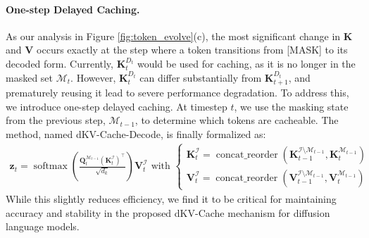 \documentclass{article}
\newcommand{\dmethodname}{dKV-Cache-Decode}
\newcommand{\bk}{\mathbf{K}}
\newcommand{\bv}{\mathbf{V}}
\begin{document}
\paragraph{One-step Delayed Caching.} As our analysis in Figure \ref{fig:token_evolve}(c), the most significant change in $\bk$ and $\bv$ occurs exactly at the step where a token transitions from [MASK] to its decoded form. Currently, $\mathbf{K}_t^{D_t}$ would be used for caching, as it is no longer in the masked set $\mathcal{M}_t$. However, $\mathbf{K}_t^{D_t}$ can differ substantially from $\mathbf{K}_{t+1}^{D_t}$, and prematurely reusing it lead to severe performance degradation. To address this, we introduce one-step delayed caching. At timestep $t$, we use the masking state from the previous step, $\mathcal{M}_{t-1}$, to determine which tokens are cacheable. The method, named \dmethodname, is finally formalized as:
\begin{align}
    \mathbf{z}_t=\operatorname{softmax}\left(\frac{\mathbf{Q}_t^{\mathcal{M}_{t-1}}\left(\mathbf{K}_t^{\mathcal{I}   }\right)^{\top}}{\sqrt{d_k}}\right) \mathbf{V}_t^{\mathcal{I}} 
    \text{ with } \left\{\begin{array}{l} \mathbf{K}_t^{\mathcal{I}}=\operatorname{concat\_reorder}\left(\mathbf{K}_{t-1}^{\mathcal{I}\setminus\mathcal{M}_{t-1}}, \mathbf{K}_{t}^{\mathcal{M}_{t-1}}\right) \\ \mathbf{V}_t^{\mathcal{I}}=\operatorname{concat\_reorder}\left(\mathbf{V}_{t-1}^{\mathcal{I}\setminus\mathcal{M}_{t-1}}, \mathbf{V}_{t}^{\mathcal{M}_{t-1}}\right) \end{array}\right. 
    \label{eq:kv_decode}
\end{align}
While this slightly reduces efficiency, we find it to be critical for maintaining accuracy and stability in the proposed dKV-Cache mechanism for diffusion language models. 

\end{document}
